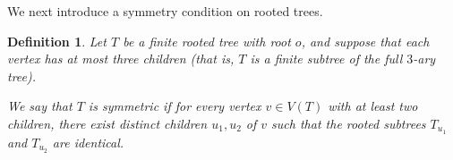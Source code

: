 \documentclass[a4,12pt]{article}%
\newtheorem{definition}[theorem]{Definition}
\newcommand{\N}{\mathbb{N}}
\begin{document}
\medskip

We next introduce a symmetry condition on rooted trees.

\begin{definition}
Let $T$ be a finite rooted tree with root $o$, and suppose that each vertex has at most three children (that is, $T$ is a finite subtree of the full $3$-ary tree).

We say that $T$ is \emph{symmetric} if for every vertex $v \in V(T)$ with at least two children, there exist distinct children $u_1,u_2$ of $v$ such that the rooted subtrees $T_{u_1}$ and $T_{u_2}$ are identical.
\end{definition}










\end{document}
